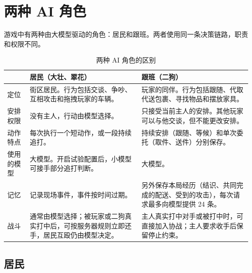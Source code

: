 \documentclass[11pt]{article}
\begin{document}
\section{两种 AI 角色}

游戏中有两种由大模型驱动的角色：居民和跟班。两者使用同一条决策链路，职责和权限不同。

\begin{table}[H]
\small
\begin{tabularx}{\textwidth}{@{}l L L@{}}
\toprule
 & \textbf{居民（大壮、翠花）} & \textbf{跟班（二狗）} \\
\midrule
定位 & 街区居民。行为包括交谈、争吵、互相攻击和拖拽玩家的车辆。 & 玩家的同伴。行为包括跟随、代取代送包裹、寻找物品和摆放家具。 \\
安排权限 & 没有主人，行动由模型选择。 & 只接受当前主人的安排。其他玩家可以与他交谈，但不能更改安排。 \\
动作特点 & 每次执行一个短动作，或一段持续追打。 & 持续安排（跟随、等候）和单次委托（取件、送件）分别保存。 \\
使用的模型 & 大模型。开启试验配置后，小模型可接手部分追打判断。 & 大模型。 \\
记忆 & 记录现场事件，事件按时间过期。 & 另外保存本局经历（结识、共同完成的配送、受到的攻击），每次请求最多向模型提供 24 条。 \\
战斗 & 通常由模型选择；被玩家或二狗真实打中后，可按服务器规则立即还手，居民互殴仍由模型决定。 & 主人真实打中对手或被打中时，可直接加入协战；主人要求收手后保留停止约束。 \\
\bottomrule
\end{tabularx}
\caption{两种 AI 角色的区别}
\end{table}

\subsection{居民}
\end{document}
